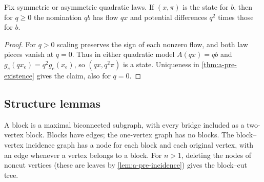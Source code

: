\begin{lemma}[Homogeneity]
\label{lem:a-pre-homogeneity}
Fix symmetric or asymmetric quadratic laws. If $(x,\pi)$ is the state
for $b$, then for
$q\ge0$ the nomination $qb$ has flow $qx$ and potential differences
$q^2$ times those for $b$.
\end{lemma}
\begin{proof}
For $q>0$ scaling preserves the sign of each nonzero flow, and both
law pieces vanish at $q=0$. Thus in either quadratic model
$A(qx)=qb$ and $g_e(qx_e)=q^2g_e(x_e)$, so $(qx,q^2\pi)$ is a state.
Uniqueness in \cref{thm:a-pre-existence} gives the claim, also for $q=0$.
\end{proof}

\subsection{Structure lemmas}
\label{subsec:a-pre-structure}
A block is a maximal biconnected subgraph, with every bridge included as
a two-vertex block. Blocks have edges; the one-vertex graph has no blocks.
The block--vertex incidence graph has a node for each block and each
original vertex, with an edge whenever a vertex belongs to a block.
For $n>1$, deleting the nodes of noncut vertices (these are leaves by
\cref{lem:a-pre-incidence}) gives the block--cut tree.

